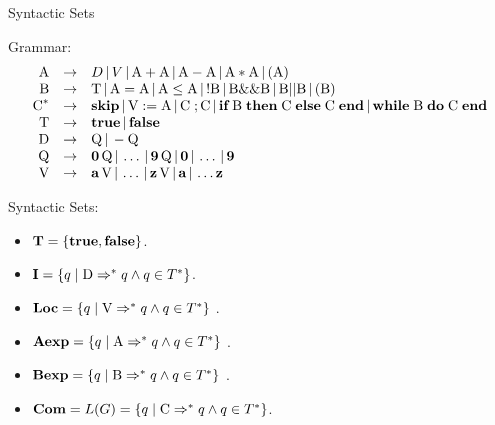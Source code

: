 \documentclass{beamer}
\begin{document}
\begin{frame}{Syntactic Sets}

\scriptsize

Grammar:
\[
\begin{array}{rcl}
\mbox{A} &\rightarrow& D \,|\, V \,|\, \mbox{A} +\mbox{A} \,|\, \mbox{A} - \mbox{A} \,|\,
	\mbox{A} * \mbox{A}\,|\, ( \mbox{A} )\\

\mbox{B} &\rightarrow& \mbox{T}  \,|\, \mbox{A} = \mbox{A} \,|\,
	\mbox{A} \le \mbox{A} \,|\, ! \mbox{B} \,|\, \mbox{B} \&\& \mbox{B} \,|\,
	\mbox{B} || \mbox{B} \,|\, (\mbox{B})\\

\mbox{C}^* &\rightarrow& \mbox{\bf skip} \,|\, \mbox{V} := \mbox{A} \,|\,\mbox{C}\; ; \mbox{C} \,|\,
	\mbox{\bf if} \; \mbox{B}\; \mbox{\bf then}\;\mbox{C}\; \mbox{\bf else}\; \mbox{C} \; \mbox{\bf end}\,|\,
	\mbox{\bf while}\; \mbox{B}\; \mbox{\bf  do}\; \mbox{C}\; \mbox{\bf end}\\

\mbox{T} &\rightarrow& \mbox{\bf true} \,|\, \mbox{\bf false}\\

\mbox{D} &\rightarrow& \mbox{Q} \,|\, - \mbox{Q}\\

\mbox{Q} &\rightarrow& \mbox{\bf 0}\, \mbox{Q} \,|\, \ldots \,|\,  \mbox{\bf 9} \,\mbox{Q} \,|\, \mbox{\bf 0} \,|\, \ldots\,|\,\mbox{\bf 9}\\

\mbox{V} &\rightarrow& \mbox{\bf a}\,\mbox{V} \,|\, \ldots\,|\, \mbox{\bf z}\,\mbox{V} \,|\, \mbox{\bf a} \,|\, \ldots \mbox{\bf z}
\end{array}
\]

Syntactic Sets:
\begin{itemize}
\item $\mbox{\bf T} = \{  \mbox{\bf true} ,\mbox{\bf false} \}$.
\item $\mbox{\bf I} = \{ q \mid \mbox{D} \Rightarrow^* q \wedge q \in T^*\}$.
\item $\mbox{\bf Loc} = \{ q \mid \mbox{V} \Rightarrow^* q \wedge q \in T^*\}$ .
\item $\mbox{\bf Aexp} = \{ q \mid \mbox{A} \Rightarrow^* q \wedge q \in T^*\}$ .
\item $\mbox{\bf Bexp} = \{ q \mid \mbox{B} \Rightarrow^* q \wedge q \in T^*\}$ .
\item $\mbox{\bf Com} = L(G) = \{ q \mid \mbox{C} \Rightarrow^* q \wedge q \in T^*\}$.
\end{itemize}

\end{frame}
\end{document}

